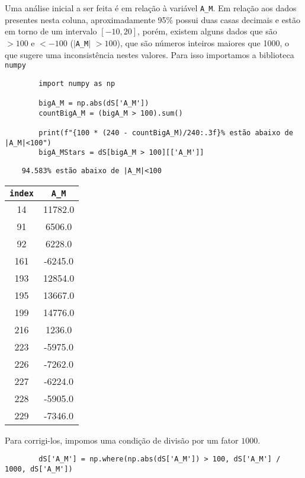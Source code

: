 Uma análise inicial a ser feita é em relação à variável \verb|A_M|. Em relação aos dados presentes nesta coluna, aproximadamente 95\% possui duas casas decimais e estão em torno de um intervalo $[-10, 20]$, porém, existem alguns dados que são $> 100$ e $< -100$ ($|$\verb|A_M|$|$ $> 100$), que são números inteiros maiores que 1000, o que sugere uma inconsistência nestes valores. Para isso importamos a biblioteca \verb|numpy|
\begin{longlisting}
    \begin{verbatim}
        import numpy as np
        
        bigA_M = np.abs(dS['A_M'])
        countBigA_M = (bigA_M > 100).sum()
        
        print(f"{100 * (240 - countBigA_M)/240:.3f}% estão abaixo de |A_M|<100")
        bigA_MStars = dS[bigA_M > 100][['A_M']]
    \end{verbatim}
\end{longlisting}
\begin{verbatim}
    94.583% estão abaixo de |A_M|<100
\end{verbatim}
\begin{table}[H]
    \centering
    \begin{tabular}{cc}
        \toprule
        \verb|index| & \verb|A_M|  \\ 
        \midrule
        14 & 11782.0 \\
        91 & 6506.0 \\
        92 & 6228.0 \\
        161 & -6245.0 \\
        193 & 12854.0 \\
        195 & 13667.0 \\
        199 & 14776.0 \\
        216 & 1236.0 \\
        223 & -5975.0 \\
        226 & -7262.0 \\
        227 & -6224.0 \\
        228 & -5905.0 \\
        229 & -7346.0 \\
        \bottomrule
    \end{tabular}
\end{table}

Para corrigi-los, impomos uma condição de divisão por um fator $1000$. 
\begin{longlisting}
    \begin{verbatim}
        dS['A_M'] = np.where(np.abs(dS['A_M']) > 100, dS['A_M'] / 1000, dS['A_M'])
    \end{verbatim}
\end{longlisting}

